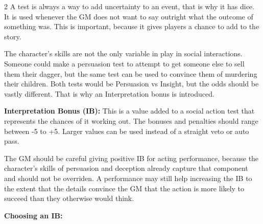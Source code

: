 \begin{multicols}{2}
A test is always a way to add uncertainty to an event, that is why it has dice. It is used whenever the GM does not want to say outright what the outcome of something was. This is important, because it gives players a chance to add to the story.

The character's skills are not the only variable in play in social interactions. Someone could make a persuasion test to attempt to get someone else to sell them their dagger, but the same test can be used to convince them of murdering their children. Both tests would be Persuasion vs Insight, but the odds should be vastly different. That is why an Interpretation bonus is introduced. 

\textbf{Interpretation Bonus (IB):} This is a value added to a social action test that represents the chances of it working out. The bonuses and penalties should range between -5 to +5. Larger values can be used instead of a straight veto or auto pass.

The GM should be careful giving positive IB for acting performance, because the character's skills of persuasion and deception already capture that component and should not be overriden. A performance may still help increasing the IB to the extent that the details convince the GM that the action is more likely to succeed than they otherwise would think.  

\textbf{Choosing an IB:} 


\end{multicols}
